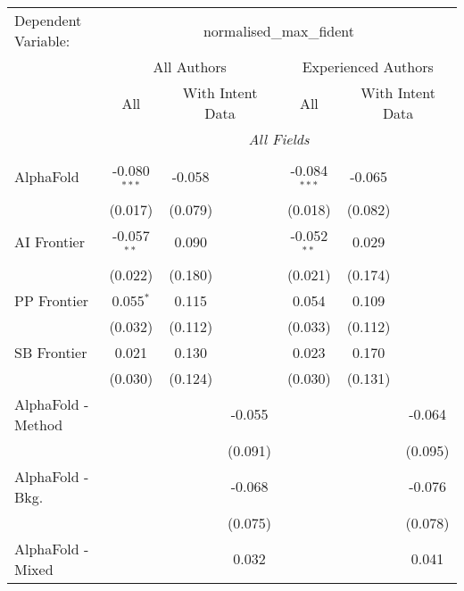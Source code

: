 \begingroup
\centering
\begin{tabular}{lcccccc}
   \tabularnewline \midrule \midrule
   Dependent Variable: & \multicolumn{6}{c}{normalised\_max\_fident}\\
 & \multicolumn{3}{c}{All Authors} & \multicolumn{3}{c}{Experienced Authors} \\
\cmidrule(lr){2-4} \cmidrule(lr){5-7}
 & \multicolumn{1}{c}{All} & \multicolumn{2}{c}{With Intent Data} & \multicolumn{1}{c}{All} & \multicolumn{2}{c}{With Intent Data} \\
\cmidrule(lr){2-2} \cmidrule(lr){3-4} \cmidrule(lr){5-5} \cmidrule(lr){6-7}
 & \multicolumn{6}{c}{\textit{All Fields}} \\ \\
   AlphaFold            & -0.080$^{***}$ & -0.058  &            & -0.084$^{***}$ & -0.065  &   \\   
                        & (0.017)        & (0.079) &            & (0.018)        & (0.082) &   \\   
   AI Frontier          & -0.057$^{**}$  & 0.090   &            & -0.052$^{**}$  & 0.029   &   \\   
                        & (0.022)        & (0.180) &            & (0.021)        & (0.174) &   \\   
   PP Frontier          & 0.055$^{*}$    & 0.115   &            & 0.054          & 0.109   &   \\   
                        & (0.032)        & (0.112) &            & (0.033)        & (0.112) &   \\   
   SB Frontier          & 0.021          & 0.130   &            & 0.023          & 0.170   &   \\   
                        & (0.030)        & (0.124) &            & (0.030)        & (0.131) &   \\   
   AlphaFold - Method   &                &         & -0.055     &                &         & -0.064\\   
                        &                &         & (0.091)    &                &         & (0.095)\\   
   AlphaFold - Bkg.     &                &         & -0.068     &                &         & -0.076\\   
                        &                &         & (0.075)    &                &         & (0.078)\\   
   AlphaFold - Mixed    &                &         & 0.032      &                &         & 0.041\\   

\end{tabular}
